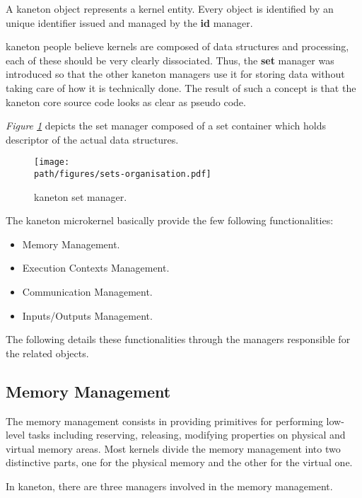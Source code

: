 A kaneton object represents a kernel entity. Every object is identified by
an unique identifier issued and managed by the \textbf{id} manager.

kaneton people believe kernels are composed of data structures and processing,
each of these should be very clearly dissociated. Thus, the \textbf{set}
manager was introduced so that the other kaneton managers use it for storing
data without taking care of how it is technically done. The result of such
a concept is that the kaneton core source code looks as clear as pseudo code.

\textit{Figure \ref{figure:sets-organisation}} depicts the set manager
composed of a set container which holds descriptor of the actual data
structures.

\begin{figure}[h]
  \begin{center}
    \texttt{[image: \\path/figures/sets-organisation.pdf]}
    \caption{kaneton set manager.}
    \label{figure:sets-organisation}
  \end{center}
\end{figure}

The kaneton microkernel basically provide the few following functionalities:

\begin{itemize}
  \item
    Memory Management.
  \item
    Execution Contexts Management.
  \item
    Communication Management.
  \item
    Inputs/Outputs Management.
\end{itemize}

The following details these functionalities through the managers responsible
for the related objects.


\subsection*{Memory Management}

The memory management consists in providing primitives for performing low-level
tasks including reserving, releasing, modifying properties on physical and
virtual memory areas. Most kernels divide the memory management into two
distinctive parts, one for the physical memory and the other for the virtual
one.

In kaneton, there are three managers involved in the memory management.

